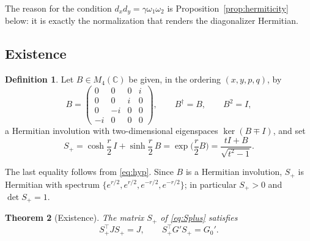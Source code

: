 \documentclass[11pt]{article}
\newtheorem{theorem}{Theorem}[section]
\theoremstyle{definition}
\newtheorem{definition}[theorem]{Definition}
\theoremstyle{remark}
\newcommand{\C}{\mathbb{C}}
\newcommand{\w}{\omega}
\newcommand{\dg}{\dagger}
\begin{document}
The reason for the condition $d_xd_y=\gamma\w_1\w_2$ is
Proposition~\ref{prop:hermiticity} below: it is exactly the normalization
that renders the diagonalizer Hermitian.

\subsection{Existence}

\begin{definition}\label{def:B}
Let $B\in M_4(\C)$ be given, in the ordering $(x,y,p,q)$, by
\begin{equation}
B=\begin{pmatrix}0&0&0&i\\0&0&i&0\\0&-i&0&0\\-i&0&0&0\end{pmatrix},
\qquad B^{\dg}=B,\qquad B^2=I,
\end{equation}
a Hermitian involution with two-dimensional eigenspaces
$\ker(B\mp I)$, and set
\begin{equation}\label{eq:Splus}
S_+=\cosh\frac r2\, I+\sinh\frac r2\, B
=\exp\!\Big(\frac r2 B\Big)
=\frac{tI+B}{\sqrt{t^2-1}} .
\end{equation}
\end{definition}

The last equality follows from \eqref{eq:hyp}.  Since $B$ is a Hermitian
involution, $S_+$ is Hermitian with spectrum
$\{e^{r/2},e^{r/2},e^{-r/2},e^{-r/2}\}$; in particular $S_+>0$ and
$\det S_+=1$.

\begin{theorem}[Existence]\label{thm:existence}
The matrix $S_+$ of \eqref{eq:Splus} satisfies
\begin{equation}
S_+^{\top}JS_+=J,
\qquad
S_+^{\top}G'S_+=G_0' .
\end{equation}
\end{theorem}
\end{document}
